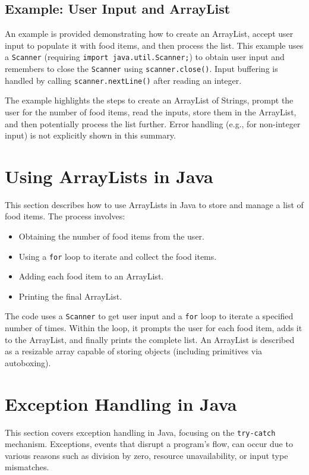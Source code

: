 \documentclass{article}
\begin{document}
\subsection{Example: User Input and ArrayList}

An example is provided demonstrating how to create an ArrayList, accept user input to populate it with food items, and then process the list.  This example uses a \texttt{Scanner} (requiring \texttt{import java.util.Scanner;}) to obtain user input and remembers to close the \texttt{Scanner} using \texttt{scanner.close()}.  Input buffering is handled by calling \texttt{scanner.nextLine()} after reading an integer.

The example highlights the steps to create an ArrayList of Strings, prompt the user for the number of food items, read the inputs, store them in the ArrayList, and then potentially process the list further.  Error handling (e.g., for non-integer input) is not explicitly shown in this summary.


\section{Using ArrayLists in Java}

This section describes how to use ArrayLists in Java to store and manage a list of food items.  The process involves:

\begin{itemize}
\item Obtaining the number of food items from the user.
\item Using a \texttt{for} loop to iterate and collect the food items.
\item Adding each food item to an ArrayList.
\item Printing the final ArrayList.
\end{itemize}

The code uses a \texttt{Scanner} to get user input and a \texttt{for} loop to iterate a specified number of times. Within the loop, it prompts the user for each food item, adds it to the ArrayList, and finally prints the complete list.  An ArrayList is described as a resizable array capable of storing objects (including primitives via autoboxing).


\section{Exception Handling in Java}

This section covers exception handling in Java, focusing on the \texttt{try-catch} mechanism.  Exceptions, events that disrupt a program's flow, can occur due to various reasons such as division by zero, resource unavailability, or input type mismatches.
\end{document}
